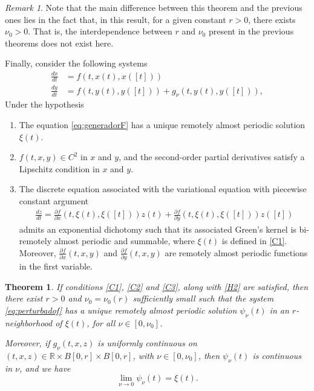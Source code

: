 \documentclass[english,,reqno]{amsart}
\numberwithin{equation}{section}
\theoremstyle{plain}
\newtheorem{thm}{Theorem}[section]
\theoremstyle{definition}
\theoremstyle{remark}
\newtheorem*{rem}{Remark}
\begin{document}
\begin{rem}
Note that the main difference between this theorem and the previous ones lies in the fact that, in this result, for a given constant $r>0$, there exists $\nu_0 > 0$.  
That is, the interdependence between $r$ and $\nu_0$ present in the previous theorems does not exist here.
\end{rem}



Finally, consider the following systems
\begin{align}
\frac{dx}{dt} & =f\left(t,x(t),x([t])\right)\label{eq:generadorF}\\
\frac{dy}{dt} & =f\left(t,y(t),y([t])\right)+g_{\nu}\left(t,y\left(t\right),y([t])\right),\label{eq:perturbadof}
\end{align}
Under the hypothesis

\begin{enumerate}[label=\textbf{(C.\arabic*)}]
\item\label{C1} The equation \eqref{eq:generadorF} has a unique remotely almost periodic solution $\xi(t)$.
\item\label{C2} $f(t, x, y) \in C^{2}$ in $x$ and $y$, and the second-order partial derivatives satisfy a Lipschitz condition in $x$ and $y$.
\item\label{C3} The discrete equation associated with the variational equation with piecewise constant argument
\begin{eqnarray*}
\frac{dz}{dt} = \frac{\partial f}{\partial x}(t, \xi(t), \xi([t])) z(t) + \frac{\partial f}{\partial y}(t, \xi(t), \xi([t])) z([t])
\end{eqnarray*}
admits an exponential dichotomy such that its associated Green's kernel is bi-remotely almost periodic and summable, where $\xi(t)$ is defined in \ref{C1}.  
Moreover, $\frac{\partial f}{\partial x}(t, x, y)$ and $\frac{\partial f}{\partial y}(t, x, y)$ are remotely almost periodic functions in the first variable.
\end{enumerate}

\begin{thm}\label{perturbed_f_nolineal}
If conditions \ref{C1}, \ref{C2} and \ref{C3}, along with \ref{H2} are satisfied,  
then there exist $r > 0$ and $\nu_0 = \nu_0(r)$ sufficiently small such that the system \eqref{eq:perturbadof}  
has a unique remotely almost periodic solution $\psi_\nu(t)$ in an $r$-neighborhood of $\xi(t)$, for all $\nu \in [0, \nu_0]$.

Moreover, if $g_\nu(t, x, z)$ is uniformly continuous on $(t, x, z) \in \mathbb{R} \times B[0, r] \times B[0, r]$, with $\nu \in [0, \nu_0]$,  
then $\psi_\nu(t)$ is continuous in $\nu$, and we have  
\[
\lim_{\nu \rightarrow 0} \psi_\nu(t) = \xi(t).
\]
\end{thm}
\end{document}
